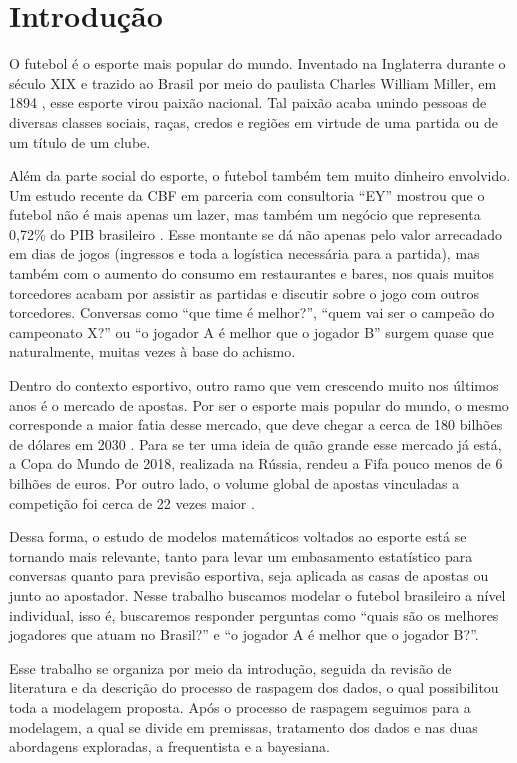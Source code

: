 \chapter{Introdução}
\label{intro}

O futebol é o esporte mais popular do mundo. Inventado na Inglaterra durante o século XIX e trazido ao Brasil por meio do paulista Charles William Miller, em 1894 \cite{wikifutebol}, esse esporte virou paixão nacional. Tal paixão acaba unindo pessoas de diversas classes sociais, raças, credos e regiões em virtude de uma partida ou de um título de um clube.

Além da parte social do esporte, o futebol também tem muito dinheiro envolvido. Um estudo recente da CBF em parceria com consultoria ``EY'' mostrou que o futebol não é mais apenas um lazer, mas também um negócio que representa 0,72\% do PIB brasileiro \cite{oeconomista}. Esse montante se dá não apenas pelo valor arrecadado em dias de jogos (ingressos e toda a logística necessária para a partida), mas também com o aumento do consumo em restaurantes e bares, nos quais muitos torcedores acabam por assistir as partidas e discutir sobre o jogo com outros torcedores. Conversas como ``que time é melhor?'', ``quem vai ser o campeão do campeonato X?'' ou ``o jogador A é melhor que o jogador B'' surgem quase que naturalmente, muitas vezes à base do achismo.

Dentro do contexto esportivo, outro ramo que vem crescendo muito nos últimos anos é o mercado de apostas. Por ser o esporte mais popular do mundo, o mesmo corresponde a maior fatia desse mercado, que deve chegar a cerca de 180 bilhões de dólares em 2030 \cite{gvr}. Para se ter uma ideia de quão grande esse mercado já está, a Copa do Mundo de 2018, realizada na Rússia, rendeu a Fifa pouco menos de 6 bilhões de euros. Por outro lado, o volume global de apostas vinculadas a competição foi cerca de 22 vezes maior \cite{gaz}.

Dessa forma, o estudo de modelos matemáticos voltados ao esporte está se tornando mais relevante, tanto para levar um embasamento estatístico para conversas quanto para previsão esportiva, seja aplicada as casas de apostas ou junto ao apostador. Nesse trabalho buscamos modelar o futebol brasileiro a nível individual, isso é, buscaremos responder perguntas como ``quais são os melhores jogadores que atuam no Brasil?'' e ``o jogador A é melhor que o jogador B?''.

Esse trabalho se organiza por meio da introdução, seguida da revisão de literatura e da descrição do processo de raspagem dos dados, o qual possibilitou toda a modelagem proposta. Após o processo de raspagem seguimos para a modelagem, a qual se divide em premissas, tratamento dos dados e nas duas abordagens exploradas, a frequentista e a bayesiana.